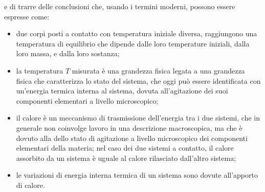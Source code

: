 \documentclass[letterpaper,10pt,italian]{jupyterBook}
\begin{document}
\sphinxAtStartPar
e di trarre delle conclusioni che, usando i termini moderni, possono essere espresse come:
\begin{itemize}
\item {} 
\sphinxAtStartPar
due corpi posti a contatto con temperatura iniziale diversa, raggiungono una temperatura di equilibrio che dipende dalle loro temperature iniziali, dalla loro massa, e dalla loro sostanza;

\item {} 
\sphinxAtStartPar
la temperatura \(T\) misurata è una grandezza fisica legata a una grandezza fisica che caratterizza lo stato del sistema, che oggi può essere identificata con un’energia termica interna al sistema, dovuta all’agitazione dei suoi componenti elementari a livello microscopico;

\item {} 
\sphinxAtStartPar
il calore è un meccanismo di trasmissione dell’energia tra i due sistemi, che in generale non coinvolge lavoro in una descrizione macroscopica, ma che è dovuto alla  dello stato di agitazione a livello microscopico dei componenti elementari della materia; nel caso dei due sistemi a contatto, il calore assorbito da un sistema è uguale al calore rilasciato dall’altro sistema;

\item {} 
\sphinxAtStartPar
le variazioni di energia interna termica di un sistema sono dovute all’apporto di calore.

\end{itemize}
\end{document}
